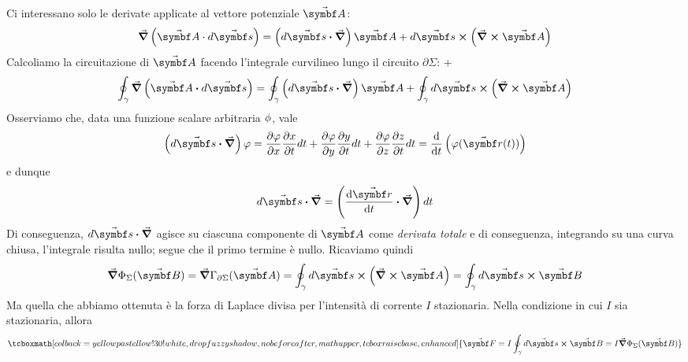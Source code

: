 Ci interessano solo le derivate applicate al vettore potenziale $\vba{A}$:
\begin{equation*}
	\grad{\left(\vba{A}\cdot d\vba{s}\right)}=\left(d\vba{s}\vdot\grad\right)\vba{A}+d\vba{s}\cross\left(\grad\cross\vba{A}\right)
\end{equation*}
Calcoliamo la circuitazione di $\vba{A}$ facendo l'integrale curvilineo lungo il circuito $\partial \Sigma$:
+\begin{equation}
	\oint_{\gamma}\grad{\left(\vba{A}\vdot d\vba{s}\right)}=\oint_{\gamma} \left(d\vba{s}\vdot\grad\right)\vba{A}+\oint_{\gamma} d\vba{s}\cross\left(\grad\cross\vba{A}\right)
\end{equation}
Osserviamo che, data una funzione scalare arbitraria $\oldphi$, vale
\begin{equation*}
	\left(d\vba{s}\vdot\grad\right)\phi=\pdv{\phi}{x}\pdv{x}{t}dt+\pdv{\phi}{y}\pdv{y}{t}dt+\pdv{\phi}{z}\pdv{z}{t}dt=\dv{t} \left(\phi(\vba{r}(t))\right)
\end{equation*}
e dunque
\begin{equation}
	d\vba{s}\vdot\grad=\left(\dv{\vba{r}}{t}\vdot\grad\right)dt
\end{equation}
Di conseguenza, $d\vba{s}\vdot\grad$ agisce su ciascuna componente di $\vba{A}$ come \textit{derivata totale} e di conseguenza, integrando su una curva chiusa, l'integrale risulta nullo; segue che il primo termine è nullo. Ricaviamo quindi
\begin{equation*}
	\grad{\Phi_{\Sigma}(\vba{B})}=\grad{\Gamma_{\partial \Sigma}(\vba{A})}=\oint_{\gamma} d\vba{s}\cross\left(\grad\cross\vba{A}\right)=\oint_{\gamma} d\vba{s}\cross\vba{B}
\end{equation*}
Ma quella che abbiamo ottenuta è la forza di Laplace divisa per l'intensità di corrente $I$ stazionaria. Nella condizione in cui $I$ sia stazionaria, allora
\begin{equation}
	\tcboxmath[colback=yellowpastellow!30!white,drop fuzzy shadow, nobeforeafter, math upper, tcbox raise base, enhanced]{\vba{F}=I\oint_{\gamma}d\vba{s}\cross\vba{B}=I\grad{\Phi_{\Sigma}(\vba{B})}}
\end{equation}
